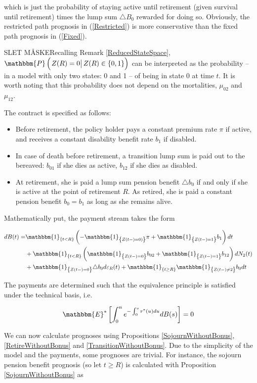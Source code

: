 \documentclass{article}
\newcommand{\1}[1]{\mathbbm{1}_{\left\lbrace #1 \right\rbrace}}
\newcommand{\pcond}[2][def]{\mathbbm{P} \left( \left. #1 \right| #2 \right)}
\newcommand{\expecStar}[1][def]{\mathbbm{E}^* \left[ #1 \right]}
\theoremstyle{break}
\theoremstyle{remark}
\numberwithin{equation}{section}
\begin{document}
which is just the probability of staying active until retirement (given survival until retirement) times the lump sum $\triangle B_0$ rewarded for doing so. Obviously, the restricted path prognosis in (\ref{Restricted}) is more conservative than the fixed path prognosis in (\ref{Fixed}).

SLET MÅSKERecalling Remark \ref{ReducedStateSpace}, $\pcond[Z(R) = 0]{Z(R) \in \{ 0,1 \}}$ can be interpreted as the probability -- in a model with only two states: 0 and 1 -- of being in state 0 at time $t$. It is worth noting that this probability does not depend on the mortalities, $\mu_{02}$ and $\mu_{12}$.


The contract is specified as follows:

\begin{itemize}
    \item Before retirement, the policy holder pays a constant premium rate $\pi$ if active, and receives a constant disability benefit rate $b_1$ if disabled.
    \item In case of death before retirement, a transition lump sum is paid out to the bereaved: $b_{01}$ if she dies as active, $b_{12}$ if she dies as disabled.
    \item At retirement, she is paid a lump sum pension benefit $\triangle b_0$ if and only if she is active at the point of retirement $R$. As retired, she is paid a constant pension benefit $b_0=b_1$ as long as she remains alive.
\end{itemize}

Mathematically put, the payment stream takes the form

\begin{align*}
    dB(t) =& \1{t<R} \left( - \1{Z(t-)=0)} \pi + \1{Z(t-)=1} b_1 \right) dt \\
    &+ \1{t<R} \left( \1{Z(t-)=0} b_{02} + \1{Z(t-)=1} b_{12} \right) dN_2(t) \\
    &+ \1{Z(t-)=0} \triangle b_0 d \varepsilon_R(t) + \1{t \geq R} \1{Z(t-) \neq 2} b_0dt
\end{align*}

The payments are determined such that the equivalence principle is satisfied under the technical basis, i.e.

\begin{align*}
    \expecStar[\int_0^n e^{-\int_0^s r^*(u)du} dB(s)] = 0
\end{align*}

We can now calculate prognoses using Propositions \ref{SojournWithoutBonus}, \ref{RetireWithoutBonus} and \ref{TransitionWithoutBonus}. Due to the simplicity of the model and the payments, some prognoses are trivial. For instance, the sojourn pension benefit prognosis (so let $t \geq R$) is calculated with Proposition \ref{SojournWithoutBonus} as
\end{document}
